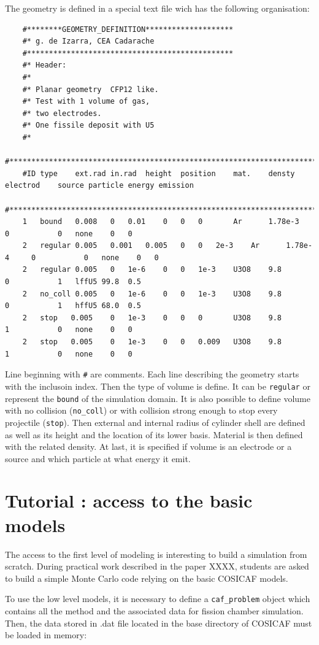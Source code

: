 \documentclass[10pt]{article}
\begin{document}
	The geometry is defined in a special text file wich has the following organisation:
	
	\begin{lstlisting}
	#********GEOMETRY_DEFINITION********************
	#* g. de Izarra, CEA Cadarache 
	#***********************************************
	#* Header: 
	#* 
	#* Planar geometry  CFP12 like. 
	#* Test with 1 volume of gas,
	#* two electrodes.
	#* One fissile deposit with U5
	#*
	#***********************************************************************
	#ID	type	ext.rad	in.rad	height	position	mat.	densty  electrod	source particle energy emission
	#***********************************************************************
	1	bound   0.008	0	0.01	0	0	0		Ar		1.78e-3		0			0	none	0	0
	2	regular	0.005	0.001	0.005	0	0	2e-3	Ar		1.78e-4		0			0	none	0	0	
	2	regular	0.005	0	1e-6	0	0	1e-3	U3O8	9.8			0			1	lffU5 99.8	0.5
	2	no_coll	0.005	0	1e-6	0	0	1e-3	U3O8	9.8			0			1	hffU5 68.0	0.5
	2	stop   0.005	0	1e-3	0	0	0		U3O8	9.8			1			0	none	0	0
	2	stop   0.005	0	1e-3	0	0	0.009	U3O8	9.8			1			0 	none	0	0	
	\end{lstlisting}
	
	Line beginning with \lstinline{#} are comments. Each line describing the geometry starts with the inclusoin index. Then the type of volume is define. It can be \lstinline{regular} or represent the \lstinline{bound}
	 of the  simulation domain. It is also possible to define volume with no collision (\lstinline{no_coll}) or with collision strong enough to stop every projectile  (\lstinline{stop}). Then external and internal radius of cylinder shell are defined as well as its height and the location of its lower basis. Material is then defined with the related density. At last, it is specified if volume is an electrode or a source and which particle at what energy it emit.
	  
	
	\section{Tutorial : access to the basic models}
	The access to the first level of modeling is interesting to build a simulation from scratch. During practical work described in the paper XXXX, students are asked to build a simple Monte Carlo code relying on the basic COSICAF models.
	
	To use the low level models, it is necessary to define a \lstinline{caf_problem} object which contains all the method and the associated data for fission chamber simulation. Then, the data stored in .dat file located in the base directory of COSICAF must be loaded in memory:
	
\end{document}

